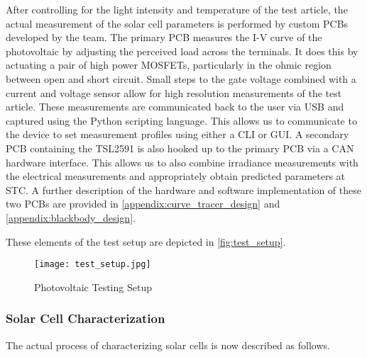 After controlling for the light intensity and temperature of the test article,
the actual measurement of the solar cell parameters is performed by custom
\acp{PCB} developed by the team. The primary \ac{PCB} measures the \ac{I-V}
curve of the photovoltaic by adjusting the perceived load across the terminals.
It does this by actuating a pair of high power \acfp{MOSFET}, particularly in
the ohmic region between open and short circuit. Small steps to the gate voltage
combined with a current and voltage sensor allow for high resolution
measurements of the test article. These measurements are communicated back to
the user via \ac{USB} and captured using the Python scripting language. This
allows us to communicate to the device to set measurement profiles using either
a \ac{CLI} or \ac{GUI}. A secondary \ac{PCB} containing the TSL2591 is also
hooked up to the primary \ac{PCB} via a \ac{CAN} hardware interface. This
allows us to also combine irradiance measurements with the electrical
measurements and appropriately obtain predicted parameters at \ac{STC}. A
further description of the hardware and software implementation of these two
\acp{PCB} are provided in \autoref{appendix:curve_tracer_design} and
\autoref{appendix:blackbody_design}.

These elements of the test setup are depicted in \autoref{fig:test_setup}.

\begin{figure}[!htbp]
    \centering
    \texttt{[image: test\_setup.jpg]}
    \caption{Photovoltaic Testing Setup}
    \label{fig:test_setup}
\end{figure}
\newpage


\subsubsection{Solar Cell Characterization}\label{subsubsec:solar_cell_characterization}

The actual process of characterizing solar cells is now described as follows.

